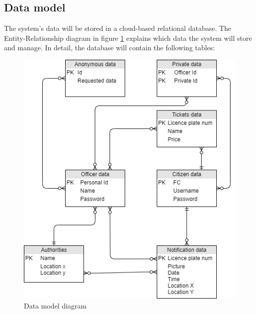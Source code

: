 \documentclass{article}
\begin{document}
	\subsection{Data model} The system's data will be stored in a cloud-based relational database. The Entity-Relationship diagram in figure \ref{fig:DataModel} explains which data the system will store and manage. In detail, the database will contain the following tables:
	\begin{figure}[h]
		\includegraphics[width=\linewidth]{images/Data_model_diagram.png}
		\caption{Data model diagram}
		\label{fig:DataModel}
	\end{figure}
	\FloatBarrier
\end{document}
